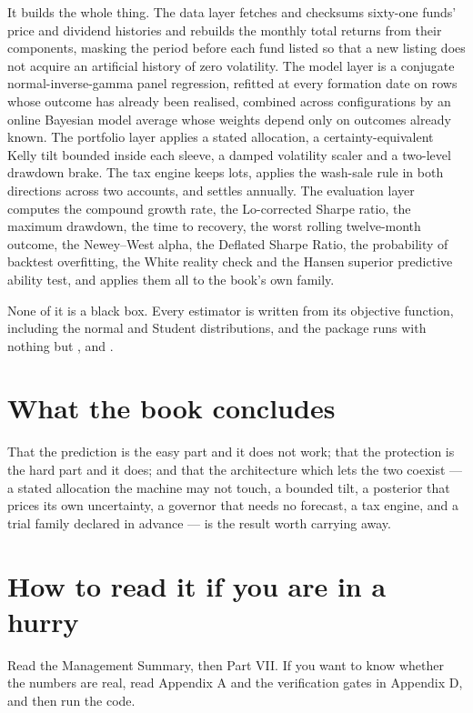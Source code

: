 It builds the whole thing. The data layer fetches and checksums sixty-one
funds' price and dividend histories and rebuilds the monthly total returns
from their components, masking the period before each fund listed so that
a new listing does not acquire an artificial history of zero volatility.
The model layer is a conjugate normal-inverse-gamma panel regression,
refitted at every formation date on rows whose outcome has already been
realised, combined across \numModelConfigs{} configurations by an online
Bayesian model average whose weights depend only on outcomes already
known. The portfolio layer applies a stated allocation, a
certainty-equivalent Kelly tilt bounded inside each sleeve, a damped
volatility scaler and a two-level drawdown brake. The tax engine keeps
lots, applies the wash-sale rule in both directions across two accounts,
and settles annually. The evaluation layer computes the compound growth
rate, the Lo-corrected Sharpe ratio, the maximum drawdown, the time to
recovery, the worst rolling twelve-month outcome, the Newey--West alpha,
the Deflated Sharpe Ratio, the probability of backtest overfitting, the
White reality check and the Hansen superior predictive ability test, and
applies them all to the book's own family.

None of it is a black box. Every estimator is written from its objective
function, including the normal and Student distributions, and the package
runs with nothing but ,  and .

\section*{What the book concludes}

That the prediction is the easy part and it does not work; that the
protection is the hard part and it does; and that the architecture which
lets the two coexist --- a stated allocation the machine may not touch, a
bounded tilt, a posterior that prices its own uncertainty, a governor
that needs no forecast, a tax engine, and a trial family declared in
advance --- is the result worth carrying away.

\section*{How to read it if you are in a hurry}

Read the Management Summary, then Part VII. If you want to know whether
the numbers are real, read Appendix A and the verification gates in
Appendix D, and then run the code.


